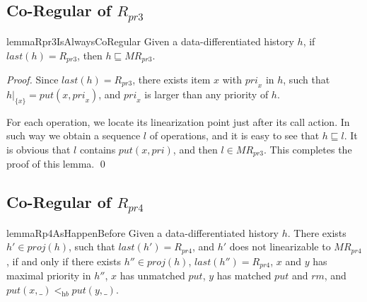 \documentclass{llncs}
\begin{document}
\subsection{Co-Regular of $R_{\textit{pr3}}$}
\label{subsec:co-regular of Rpr3}


\begin{restatable}{lemma}{Rpr3IsAlwaysCoRegular}
\label{lemma:Rpr3 is always co-regular}
Given a data-differentiated history $h$, if $\textit{last}(h) = R_{\textit{pr3}}$, then $h \sqsubseteq \textit{MR}_{\textit{pr3}}$.
\end{restatable}

\begin {proof}

Since $\textit{last}(h) = R_{\textit{pr3}}$, there exists item $x$ with $\textit{pri}_x$ in $h$, such that $h \vert_{ \{ x \}} = \textit{put}(x,\textit{pri}_x)$, and $\textit{pri}_x$ is larger than any priority of $h$.

For each operation, we locate its linearization point just after its call action. In such way we obtain a sequence $l$ of operations, and it is easy to see that $h \sqsubseteq l$. It is obvious that $l$ contains $\textit{put}(x,\textit{pri})$, and then $l \in \textit{MR}_{\textit{pr3}}$. This completes the proof of this lemma. \qed
\end {proof}



\subsection{Co-Regular of $R_{\textit{pr4}}$}
\label{subsec:co-regular of Rpr4}

\begin{restatable}{lemma}{Rp4AsHappenBefore}
\label{lemma:Rpr4 as happen before}
Given a data-differentiated history $h$. There exists $h' \in \textit{proj}(h)$, such that $\textit{last}(h') = R_{\textit{pr4}}$, and $h'$ does not linearizable to $\textit{MR}_{\textit{pr4}}$, if and only if there exists $h'' \in \textit{proj}(h)$, $\textit{last}(h'') = R_{\textit{pr4}}$, $x$ and $y$ has maximal priority in $h''$, $x$ has unmatched $\textit{put}$, $y$ has matched $\textit{put}$ and $\textit{rm}$, and $\textit{put}(x,\_) <_{\textit{hb}} \textit{put}(y,\_)$.
\end{restatable}
\end{document}
